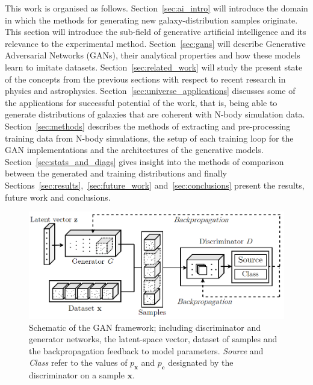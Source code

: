 \documentclass[twocolumn]{article}
\numberwithin{equation}{section}
\begin{document}
This work is organised as follows. Section~\ref{sec:ai_intro} will introduce the domain in which the methods for 
generating new galaxy-distribution samples originate. This section will introduce the sub-field of generative artificial 
intelligence and its relevance to the experimental method. Section~\ref{sec:gans} will describe Generative Adversarial 
Networks (GANs), their analytical properties and how these models learn to imitate datasets. Section~\ref{sec:related_work} 
will study the present state of the concepts from the previous sections with respect to recent research in physics and 
astrophysics. Section~\ref{sec:universe_applications} discusses some of the applications for successful potential of the 
work, that is, being able to generate distributions of galaxies that are coherent with N-body simulation data. 
Section~\ref{sec:methods} describes the methods of extracting and pre-processing training data from N-body simulations, 
the setup of each training loop for the GAN implementations and the architectures of the generative models. 
Section~\ref{sec:stats_and_diags} gives insight into the methods of comparison between the generated and training 
distributions and finally Sections~\ref{sec:results},~\ref{sec:future_work} and~\ref{sec:conclusions} present the results, 
future work and conclusions.


\begin{figure}
\includegraphics[width=\columnwidth, trim=4 4 4 4,clip]{figures/diagrams/ACGAN_diagram_box.png}
\centering
\caption{Schematic of the GAN framework; including discriminator and generator networks, the latent-space vector, dataset 
         of samples and the backpropagation feedback to model parameters. \textit{Source} and \textit{Class} refer to the
         values of $p_\mathbf{x}$ and $p_\mathbf{c}$ designated by the discriminator on a sample $\mathbf{x}$.}
\label{fig:GAN_diagram}
\end{figure}
\end{document}
